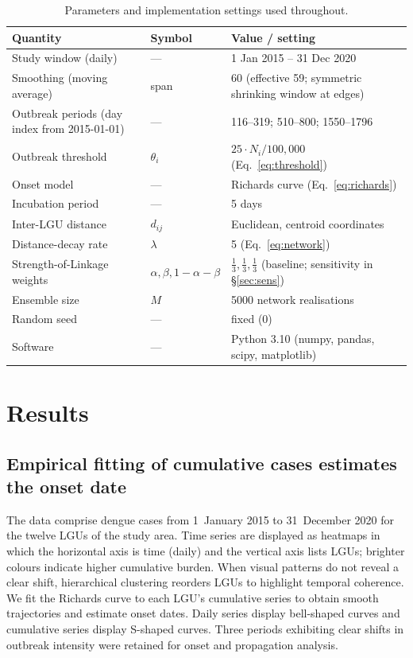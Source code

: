\documentclass[a4paper,11pt]{article}
\begin{document}
\begin{table}[htbp]
\centering
\caption{Parameters and implementation settings used throughout.}
\label{tab:params}
\small
\begin{tabular}{p{6.2cm}p{2.0cm}p{5.2cm}}
\toprule
\textbf{Quantity} & \textbf{Symbol} & \textbf{Value / setting} \\
\midrule
Study window (daily) & --- & 1 Jan 2015 -- 31 Dec 2020 \\
Smoothing (moving average) & span & 60 (effective 59; symmetric shrinking window at edges) \\
Outbreak periods (day index from 2015-01-01) & --- & 116--319; 510--800; 1550--1796 \\
Outbreak threshold & $\theta_i$ & $25\cdot N_i/100{,}000$ (Eq.~\ref{eq:threshold}) \\
Onset model & --- & Richards curve (Eq.~\ref{eq:richards}) \\
Incubation period & --- & 5 days \\
Inter-LGU distance & $d_{ij}$ & Euclidean, centroid coordinates \\
Distance-decay rate & $\lambda$ & 5 (Eq.~\ref{eq:network}) \\
Strength-of-Linkage weights & $\alpha,\beta,1{-}\alpha{-}\beta$ & $\tfrac13,\tfrac13,\tfrac13$ (baseline; sensitivity in \S\ref{sec:sens}) \\
Ensemble size & $M$ & 5000 network realisations \\
Random seed & --- & fixed (0) \\
Software & --- & Python 3.10 (numpy, pandas, scipy, matplotlib) \\
\bottomrule
\end{tabular}
\end{table}

\section{Results}
\subsection{Empirical fitting of cumulative cases estimates the onset date}
The data comprise dengue cases from 1~January 2015 to 31~December 2020 for the
twelve LGUs of the study area. Time series are displayed as heatmaps in which the
horizontal axis is time (daily) and the vertical axis lists LGUs; brighter colours
indicate higher cumulative burden. When visual patterns do not reveal a clear
shift, hierarchical clustering reorders LGUs to highlight temporal coherence. We
fit the Richards curve to each LGU's cumulative series to obtain smooth
trajectories and estimate onset dates. Daily series display bell-shaped curves and
cumulative series display S-shaped curves. Three periods exhibiting clear shifts
in outbreak intensity were retained for onset and propagation analysis.
\end{document}
